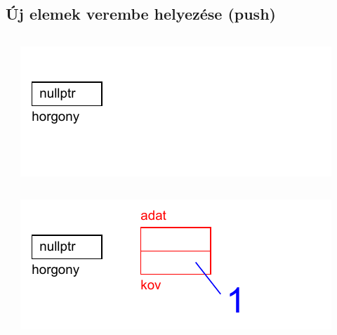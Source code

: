 \subsection{Új elemek verembe helyezése (push)}
\begin{frame}
  \begin{columns}[c]
      \begin{exampleblock}{}
        \vspace{-.2cm}
        \small
        
        \vspace{-.2cm}
      \end{exampleblock}
      \includegraphics[width=\textwidth]{verem/verem01.pdf}
  \end{columns}
\end{frame}

\begin{frame}
  \begin{columns}[c]
      \begin{exampleblock}{}
        \vspace{-.2cm}
        \small
        
        \vspace{-.2cm}
      \end{exampleblock}
      \includegraphics[width=\textwidth]{verem/verem02.pdf}
  \end{columns}
\end{frame}

